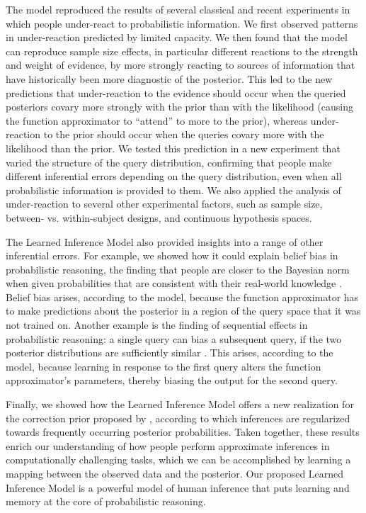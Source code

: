 The model reproduced the results of several classical and recent experiments in which people under-react to probabilistic information. We first observed patterns in under-reaction predicted by limited capacity. We then found that the model can reproduce sample size effects, in particular different reactions to the strength and weight of evidence, by more strongly reacting to sources of information that have historically been more diagnostic of the posterior. This led to the new predictions that under-reaction to the evidence should occur when the queried posteriors covary more strongly with the prior than with the likelihood (causing the function approximator to ``attend'' to more to the prior), whereas under-reaction to the prior should occur when the queries covary more with the likelihood than the prior. We tested this prediction in a new experiment that varied the structure of the query distribution, confirming that people make different inferential errors depending on the query distribution, even when all probabilistic information is provided to them. We also applied the analysis of under-reaction to several other experimental factors, such as sample size, between- vs. within-subject designs, and continuous hypothesis spaces.

The Learned Inference Model also provided insights into a range of other inferential errors. For example, we showed how it could explain belief bias in probabilistic reasoning, the finding that people are closer to the Bayesian norm when given probabilities that are consistent with their real-world knowledge \citep{cohen2017beliefs}. Belief bias arises, according to the model, because the function approximator has to make predictions about the posterior in a region of the query space that it was not trained on. Another example is the finding of sequential effects in probabilistic reasoning: a single query can bias a subsequent query, if the two posterior distributions are sufficiently similar \citep{dasgupta2018remembrance}. This arises, according to the model, because learning in response to the first query alters the function approximator's parameters, thereby biasing the output for the second query.

Finally, we showed how the Learned Inference Model offers a new realization for the correction prior proposed by \cite{zhu_sanborn_chater_2018}, according to which inferences are regularized towards frequently occurring posterior probabilities. Taken together, these results enrich our understanding of how people perform approximate inferences in computationally challenging tasks, which we can be accomplished by learning a mapping between the observed data and the posterior. Our proposed Learned Inference Model is a powerful model of human inference that puts learning and memory at the core of probabilistic reasoning.

